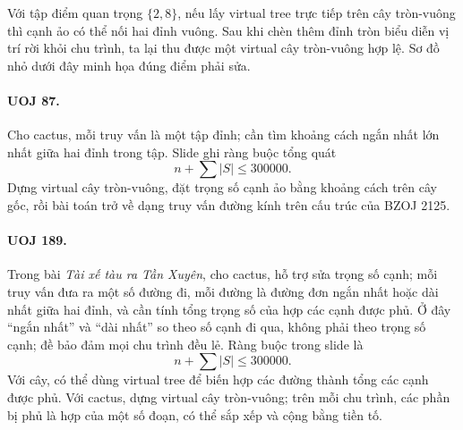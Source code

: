 \documentclass[11pt]{article}
\begin{document}
Với tập điểm quan trọng \(\{2,8\}\), nếu lấy virtual tree trực tiếp trên cây
tròn-vuông thì cạnh ảo có thể nối hai đỉnh vuông. Sau khi chèn thêm đỉnh tròn
biểu diễn vị trí rời khỏi chu trình, ta lại thu được một virtual cây
tròn-vuông hợp lệ. Sơ đồ nhỏ dưới đây minh họa đúng điểm phải sửa.

\begin{center}
\end{center}

\paragraph{UOJ 87.}
Cho cactus, mỗi truy vấn là một tập đỉnh; cần tìm khoảng cách ngắn nhất lớn
nhất giữa hai đỉnh trong tập. Slide ghi ràng buộc tổng quát
\[
  n+\sum |S|\le 300000.
\]
Dựng virtual cây tròn-vuông, đặt trọng số cạnh ảo bằng khoảng cách trên cây
gốc, rồi bài toán trở về dạng truy vấn đường kính trên cấu trúc của BZOJ 2125.

\paragraph{UOJ 189.}
Trong bài \emph{Tài xế tàu ra Tần Xuyên}, cho cactus, hỗ trợ sửa trọng số
cạnh; mỗi truy vấn đưa ra một số đường đi, mỗi đường là đường đơn ngắn nhất
hoặc dài nhất giữa hai đỉnh, và cần tính tổng trọng số của hợp các cạnh được
phủ. Ở đây ``ngắn nhất'' và ``dài nhất'' so theo số cạnh đi qua, không phải
theo trọng số cạnh; đề bảo đảm mọi chu trình đều lẻ. Ràng buộc trong slide là
\[
  n+\sum |S|\le 300000.
\]
Với cây, có thể dùng virtual tree để biến hợp các đường thành tổng các cạnh
được phủ. Với cactus, dựng virtual cây tròn-vuông; trên mỗi chu trình, các
phần bị phủ là hợp của một số đoạn, có thể sắp xếp và cộng bằng tiền tố.
\end{document}
